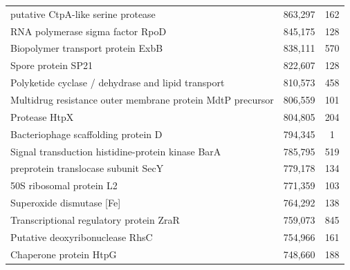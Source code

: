 \begin{singlespace}
\begin{longtable}{p{} cc}
                                                        putative CtpA-like serine protease &                     863,297 &           162 \\
                                                          RNA polymerase sigma factor RpoD &                     845,175 &           128 \\
                                                         Biopolymer transport protein ExbB &                     838,111 &           570 \\
                                                                        Spore protein SP21 &                     822,607 &           128 \\
                                        Polyketide cyclase / dehydrase and lipid transport &                     810,573 &           458 \\
                                Multidrug resistance outer membrane protein MdtP precursor &                     806,559 &           101 \\
                                                                             Protease HtpX &                     804,805 &           204 \\
                                                       Bacteriophage scaffolding protein D &                     794,345 &             1 \\
                                         Signal transduction histidine-protein kinase BarA &                     785,795 &           519 \\
                                                       preprotein translocase subunit SecY &                     779,178 &           134 \\
                                                                  50S ribosomal protein L2 &                     771,359 &           103 \\
                                                                 Superoxide dismutase [Fe] &                     764,292 &           138 \\
                                                   Transcriptional regulatory protein ZraR &                     759,073 &           845 \\
                                                           Putative deoxyribonuclease RhsC &                     754,966 &           161 \\
                                                                    Chaperone protein HtpG &                     748,660 &           188 \\

\end{longtable}
\end{singlespace}
